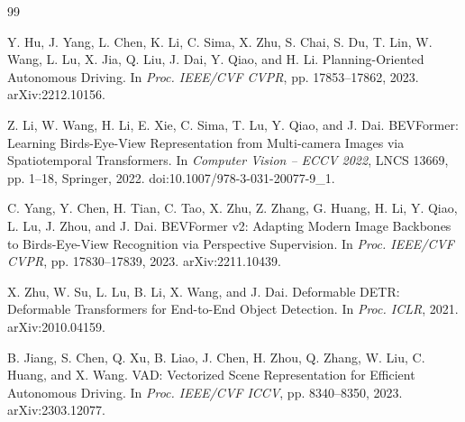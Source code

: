 \documentclass[
  english,
  10pt,
]{article}
\begin{document}
\begin{thebibliography}{99}
\begin{otherlanguage}{english}

Y. Hu, J. Yang, L. Chen, K. Li, C. Sima, X. Zhu, S. Chai, S. Du, T. Lin,
W. Wang, L. Lu, X. Jia, Q. Liu, J. Dai, Y. Qiao, and H. Li.
Planning-Oriented Autonomous Driving. In \emph{Proc. IEEE/CVF CVPR}, pp.
17853--17862, 2023. arXiv:2212.10156.

\end{otherlanguage}

\begin{otherlanguage}{english}

Z. Li, W. Wang, H. Li, E. Xie, C. Sima, T. Lu, Y. Qiao, and J. Dai.
BEVFormer: Learning Bird\textquotesingle s-Eye-View Representation from
Multi-camera Images via Spatiotemporal Transformers. In \emph{Computer
Vision -- ECCV 2022}, LNCS 13669, pp. 1--18, Springer, 2022.
doi:10.1007/978-3-031-20077-9\_1.

\end{otherlanguage}

\begin{otherlanguage}{english}

C. Yang, Y. Chen, H. Tian, C. Tao, X. Zhu, Z. Zhang, G. Huang, H. Li, Y.
Qiao, L. Lu, J. Zhou, and J. Dai. BEVFormer v2: Adapting Modern Image
Backbones to Bird\textquotesingle s-Eye-View Recognition via Perspective
Supervision. In \emph{Proc. IEEE/CVF CVPR}, pp. 17830--17839, 2023.
arXiv:2211.10439.

\end{otherlanguage}

\begin{otherlanguage}{english}

X. Zhu, W. Su, L. Lu, B. Li, X. Wang, and J. Dai. Deformable DETR:
Deformable Transformers for End-to-End Object Detection. In \emph{Proc.
ICLR}, 2021. arXiv:2010.04159.

\end{otherlanguage}

\begin{otherlanguage}{english}

B. Jiang, S. Chen, Q. Xu, B. Liao, J. Chen, H. Zhou, Q. Zhang, W. Liu,
C. Huang, and X. Wang. VAD: Vectorized Scene Representation for
Efficient Autonomous Driving. In \emph{Proc. IEEE/CVF ICCV}, pp.
8340--8350, 2023. arXiv:2303.12077.


\end{otherlanguage}
\end{thebibliography}
\end{document}
